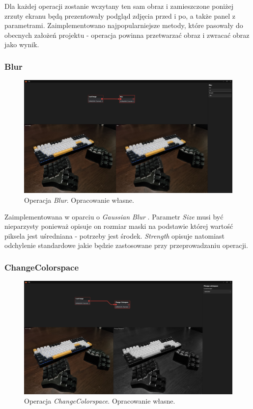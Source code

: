 Dla każdej operacji zostanie wczytany ten sam obraz i zamieszczone poniżej zrzuty ekranu będą prezentowały podgląd zdjęcia przed i po, a także panel z parametrami.
Zaimplementowano najpopularniejsze \cite{mostpop} metody, które pasowały do obecnych założeń projektu - operacja powinna przetwarzać obraz i zwracać obraz jako wynik.
\subsubsection{Blur}
\begin{figure}[H]
    \centering
    \includegraphics[width=1\linewidth]{images/Picture22.png}
    \caption{Operacja \textit{Blur}. Opracowanie własne.}
    \label{fig:blur}
\end{figure}

Zaimplementowana w oparciu o \textit{Gaussian Blur} \cite{gauss}. Parametr \textit{Size} musi być nieparzysty ponieważ opisuje on rozmiar maski na podstawie której wartość piksela jest uśredniana - potrzeby jest środek. \textit{Strength} opisuje natomiast odchylenie standardowe jakie będzie zastosowane przy przeprowadzaniu operacji.

\subsubsection{ChangeColorspace}

\begin{figure}[H]
    \centering
    \includegraphics[width=1\linewidth]{images/Picture23.png}
    \caption{Operacja \textit{ChangeColorspace}. Opracowanie własne.}
    \label{fig:colorconv}
\end{figure}

